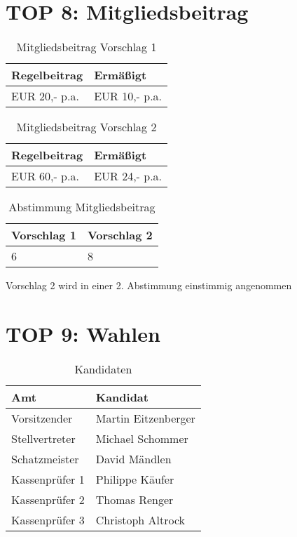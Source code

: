 \documentclass[a4paper]{scrartcl}
\begin{document}
\clearpage

\section{TOP 8: Mitgliedsbeitrag}

\begin{table}[h]
\begin{tabularx}{\textwidth}{XX}
Regelbeitrag & Ermäßigt\\
\toprule
EUR 20,- p.a. & EUR 10,- p.a.\\
\end{tabularx}
\caption{Mitgliedsbeitrag Vorschlag 1}
\end{table} 

\begin{table}[h]
\begin{tabularx}{\textwidth}{XX}
Regelbeitrag & Ermäßigt\\
\toprule
EUR 60,- p.a. & EUR 24,- p.a.\\
\end{tabularx}
\caption{Mitgliedsbeitrag Vorschlag 2}
\end{table}

\begin{table}[h]
\begin{tabularx}{\textwidth}{XX}
Vorschlag 1 & Vorschlag 2\\
\toprule
6 & 8\\
\end{tabularx}
\caption{Abstimmung Mitgliedsbeitrag}
\end{table}

Vorschlag 2 wird in einer 2. Abstimmung einstimmig angenommen

\clearpage

\section{TOP 9: Wahlen}

\begin{table}[h]
\begin{tabularx}{\textwidth}{XX}
Amt & Kandidat\\
\toprule
Vorsitzender & Martin Eitzenberger\\
Stellvertreter & Michael Schommer\\
Schatzmeister & David Mändlen\\
Kassenprüfer 1 & Philippe Käufer\\
Kassenprüfer 2 & Thomas Renger\\
Kassenprüfer 3 & Christoph Altrock\\
\end{tabularx}
\caption{Kandidaten}
\end{table}
\end{document}
